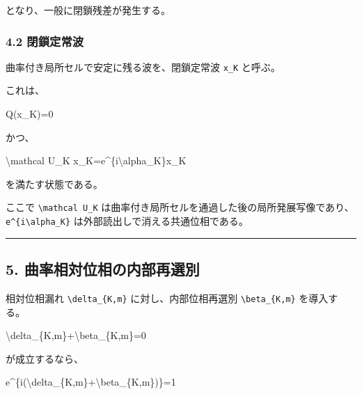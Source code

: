 \documentclass[
  a4paper,
]{article}
\newenvironment{Shaded}{}{}
\newcommand{\NormalTok}[1]{#1}
\begin{document}
となり、一般に閉鎖残差が発生する。

\subsubsection{4.2 閉鎖定常波}\label{ux9589ux9396ux5b9aux5e38ux6ce2}

曲率付き局所セルで安定に残る波を、閉鎖定常波 \texttt{x\_K} と呼ぶ。

これは、

\begin{Shaded}
\begin{Highlighting}[]
\NormalTok{Q(x\_K)=0}
\end{Highlighting}
\end{Shaded}

かつ、

\begin{Shaded}
\begin{Highlighting}[]
\NormalTok{\textbackslash{}mathcal U\_K x\_K=e\^{}\{i\textbackslash{}alpha\_K\}x\_K}
\end{Highlighting}
\end{Shaded}

を満たす状態である。

ここで \texttt{\textbackslash{}mathcal\ U\_K}
は曲率付き局所セルを通過した後の局所発展写像であり、\texttt{e\^{}\{i\textbackslash{}alpha\_K\}}
は外部読出しで消える共通位相である。

\begin{center}\rule{0.5\linewidth}{0.5pt}\end{center}

\subsection{5.
曲率相対位相の内部再選別}\label{ux66f2ux7387ux76f8ux5bfeux4f4dux76f8ux306eux5185ux90e8ux518dux9078ux5225}

相対位相漏れ \texttt{\textbackslash{}delta\_\{K,m\}}
に対し、内部位相再選別 \texttt{\textbackslash{}beta\_\{K,m\}}
を導入する。

\begin{Shaded}
\begin{Highlighting}[]
\NormalTok{\textbackslash{}delta\_\{K,m\}+\textbackslash{}beta\_\{K,m\}=0}
\end{Highlighting}
\end{Shaded}

が成立するなら、

\begin{Shaded}
\begin{Highlighting}[]
\NormalTok{e\^{}\{i(\textbackslash{}delta\_\{K,m\}+\textbackslash{}beta\_\{K,m\})\}=1}
\end{Highlighting}
\end{Shaded}
\end{document}
